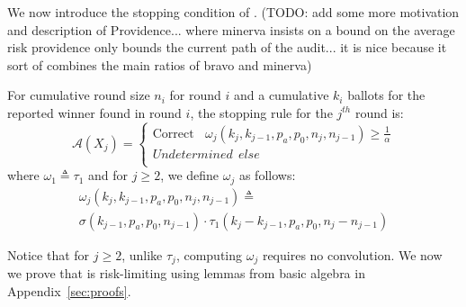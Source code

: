 We now introduce the stopping condition of \Providence.
(TODO: add some more motivation and description of Providence... where minerva insists on a bound on the average risk providence only bounds the current path of the audit... it is nice because it sort of combines the main ratios of bravo and minerva)

\begin{definition}
    \label{def:minervatwo}
    For cumulative round size $n_i$ for round $i$ and a cumulative $k_i$ ballots for the reported winner found in round $i$, the \R \Providence stopping rule for the $j^{th}$ round is:
$$
\mathcal{A}(X_{j})=  \left\{ \begin{array}{ll} \text{Correct} ~~~~ \omega_{j}(k_{j}, k_{j-1}, p_a, p_0, n_j, n_{j-1}) \geq \frac{1}{\alpha}\\
        Undetermined ~~else \\
    \end{array}
    \right .
$$
where $\omega _{1}\triangleq \tau_{1}$ and for $j\ge 2$, we define $\omega _{j}$ as follows:
\begin{equation}
    \begin{aligned}
    \omega_{j}(k_{j}, k_{j-1}, p_a, p_0, n_{j}, n_{j-1})
    \triangleq\\
    \sigma(k_{j-1},p_a,p_0,n_{j-1})\cdot \tau_1(k_{j}-k_{j-1},p_a,p_0,n_j-n_{j-1})
    \end{aligned}
\end{equation}
\end{definition}

Notice that for $j\ge 2$, unlike $\tau_j$, computing $\omega_j$ requires no convolution. We now we prove that \Providence is risk-limiting using lemmas from basic algebra in Appendix~\ref{sec:proofs}.

